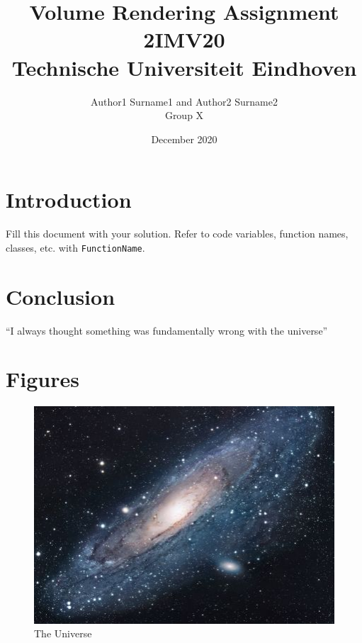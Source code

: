 \documentclass[a4paper]{article}
\title{Volume Rendering Assignment\\2IMV20\\Technische Universiteit Eindhoven}
\author{Author1 Surname1 and Author2 Surname2\\Group X}
\date{December 2020}
\begin{document}
\maketitle

\section{Introduction}

Fill this document with your solution. Refer to code variables, function names, classes, etc. with {\tt FunctionName}.

\section{Conclusion}
``I always thought something was fundamentally wrong with the universe'' \citep{adams1995hitchhiker}




\appendix
\section{Figures}

\begin{figure}[h!]
\centering
\includegraphics[scale=1.7]{universe}
\caption{The Universe}
\label{fig:universe}
\end{figure}
\end{document}
